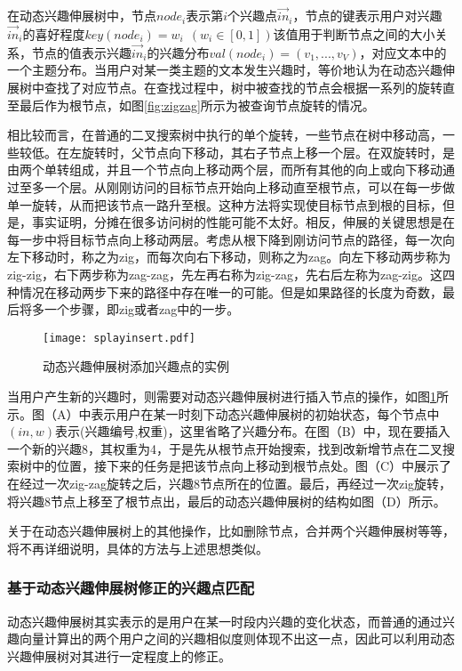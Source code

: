 在动态兴趣伸展树中，节点$node_i$表示第$i$个兴趣点$\vec{in}_i$，节点的键表示用户对兴趣$\vec{in}_i$的喜好程度$key(node_i)=w_i~~(w_i\in [0,1])$该值用于判断节点之间的大小关系，节点的值表示兴趣$\vec{in}_i$的兴趣分布$val(node_i)=(v_1,...,v_V)$，对应文本中的一个主题分布。当用户对某一类主题的文本发生兴趣时，等价地认为在动态兴趣伸展树中查找了对应节点。在查找过程中，树中被查找的节点会根据一系列的旋转直至最后作为根节点，如图\ref{fig:zigzag}所示为被查询节点旋转的情况。

相比较而言，在普通的二叉搜索树中执行的单个旋转，一些节点在树中移动高，一些较低。在左旋转时，父节点向下移动，其右子节点上移一个层。在双旋转时，是由两个单转组成，并且一个节点向上移动两个层，而所有其他的向上或向下移动通过至多一个层。从刚刚访问的目标节点开始向上移动直至根节点，可以在每一步做单一旋转，从而把该节点一路升至根。这种方法将实现使目标节点到根的目标，但是，事实证明，分摊在很多访问树的性能可能不太好。相反，伸展的关键思想是在每一步中将目标节点向上移动两层。考虑从根下降到刚访问节点的路径，每一次向左下移动时，称之为zig，而每次向右下移动，则称之为zag。向左下移动两步称为zig-zig，右下两步称为zag-zag，先左再右称为zig-zag，先右后左称为zag-zig。这四种情况在移动两步下来的路径中存在唯一的可能。但是如果路径的长度为奇数，最后将多一个步骤，即zig或者zag中的一步。

\begin{figure}[ht]
\centering
\texttt{[image: splayinsert.pdf]}
\caption{动态兴趣伸展树添加兴趣点的实例}
\label{fig:splayinsert}
\end{figure}

当用户产生新的兴趣时，则需要对动态兴趣伸展树进行插入节点的操作，如图\ref{fig:splayinsert}所示。图（A）中表示用户在某一时刻下动态兴趣伸展树的初始状态，每个节点中$(in,w)$表示(兴趣编号,权重)，这里省略了兴趣分布。在图（B）中，现在要插入一个新的兴趣8，其权重为4，于是先从根节点开始搜索，找到改新增节点在二叉搜索树中的位置，接下来的任务是把该节点向上移动到根节点处。图（C）中展示了在经过一次zig-zag旋转之后，兴趣8节点所在的位置。最后，再经过一次zig旋转，将兴趣8节点上移至了根节点出，最后的动态兴趣伸展树的结构如图（D）所示。

关于在动态兴趣伸展树上的其他操作，比如删除节点，合并两个兴趣伸展树等等，将不再详细说明，具体的方法与上述思想类似。

\subsubsection{基于动态兴趣伸展树修正的兴趣点匹配}
动态兴趣伸展树其实表示的是用户在某一时段内兴趣的变化状态，而普通的通过兴趣向量计算出的两个用户之间的兴趣相似度则体现不出这一点，因此可以利用动态兴趣伸展树对其进行一定程度上的修正。

